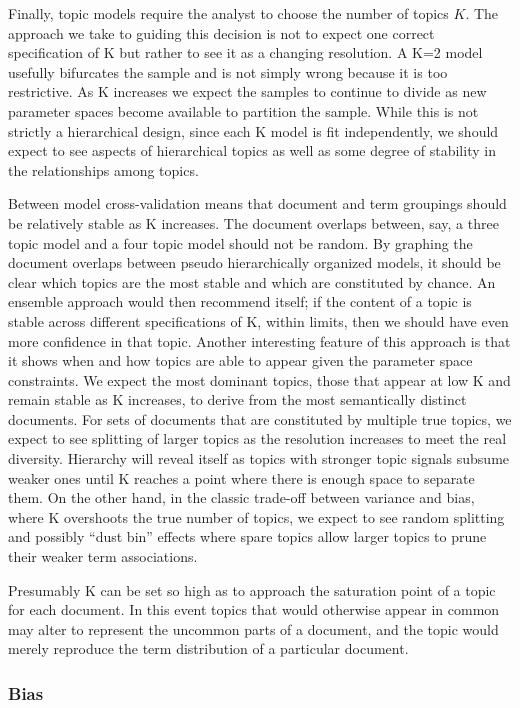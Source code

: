 \documentclass[]{book}
\theoremstyle{definition}
\theoremstyle{definition}
\theoremstyle{definition}
\theoremstyle{remark}
\begin{document}
Finally, topic models require the analyst to choose the number of topics
\(K\). The approach we take to guiding this decision is not to expect
one correct specification of K but rather to see it as a changing
resolution. A K=2 model usefully bifurcates the sample and is not simply
wrong because it is too restrictive. As K increases we expect the
samples to continue to divide as new parameter spaces become available
to partition the sample. While this is not strictly a hierarchical
design, since each K model is fit independently, we should expect to see
aspects of hierarchical topics as well as some degree of stability in
the relationships among topics.

Between model cross-validation means that document and term groupings
should be relatively stable as K increases. The document overlaps
between, say, a three topic model and a four topic model should not be
random. By graphing the document overlaps between pseudo hierarchically
organized models, it should be clear which topics are the most stable
and which are constituted by chance. An ensemble approach would then
recommend itself; if the content of a topic is stable across different
specifications of K, within limits, then we should have even more
confidence in that topic. Another interesting feature of this approach
is that it shows when and how topics are able to appear given the
parameter space constraints. We expect the most dominant topics, those
that appear at low K and remain stable as K increases, to derive from
the most semantically distinct documents. For sets of documents that are
constituted by multiple true topics, we expect to see splitting of
larger topics as the resolution increases to meet the real diversity.
Hierarchy will reveal itself as topics with stronger topic signals
subsume weaker ones until K reaches a point where there is enough space
to separate them. On the other hand, in the classic trade-off between
variance and bias, where K overshoots the true number of topics, we
expect to see random splitting and possibly ``dust bin'' effects where
spare topics allow larger topics to prune their weaker term
associations.

Presumably K can be set so high as to approach the saturation point of a
topic for each document. In this event topics that would otherwise
appear in common may alter to represent the uncommon parts of a
document, and the topic would merely reproduce the term distribution of
a particular document.

\hypertarget{bias}{%
\subsubsection{Bias}\label{bias}}
\end{document}
